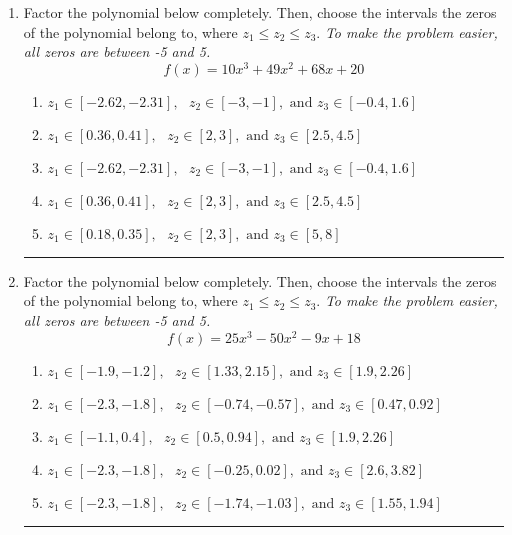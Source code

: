 \documentclass[14pt]{extbook}
\newcommand{\litem}[1]{\item#1\hspace*{-1cm}\rule{\textwidth}{0.4pt}}
\begin{document}
\begin{enumerate}
{\begin{enumerate}[label=\Alph*.]
\end{enumerate} }
\litem{
Factor the polynomial below completely. Then, choose the intervals the zeros of the polynomial belong to, where $z_1 \leq z_2 \leq z_3$. \textit{To make the problem easier, all zeros are between -5 and 5.}\[ f(x) = 10x^{3} +49 x^{2} +68 x + 20 \]\begin{enumerate}[label=\Alph*.]
\item \( z_1 \in [-2.62, -2.31], \text{   }  z_2 \in [-3, -1], \text{   and   } z_3 \in [-0.4, 1.6] \)
\item \( z_1 \in [0.36, 0.41], \text{   }  z_2 \in [2, 3], \text{   and   } z_3 \in [2.5, 4.5] \)
\item \( z_1 \in [-2.62, -2.31], \text{   }  z_2 \in [-3, -1], \text{   and   } z_3 \in [-0.4, 1.6] \)
\item \( z_1 \in [0.36, 0.41], \text{   }  z_2 \in [2, 3], \text{   and   } z_3 \in [2.5, 4.5] \)
\item \( z_1 \in [0.18, 0.35], \text{   }  z_2 \in [2, 3], \text{   and   } z_3 \in [5, 8] \)

\end{enumerate} }
\litem{
Factor the polynomial below completely. Then, choose the intervals the zeros of the polynomial belong to, where $z_1 \leq z_2 \leq z_3$. \textit{To make the problem easier, all zeros are between -5 and 5.}\[ f(x) = 25x^{3} -50 x^{2} -9 x + 18 \]\begin{enumerate}[label=\Alph*.]
\item \( z_1 \in [-1.9, -1.2], \text{   }  z_2 \in [1.33, 2.15], \text{   and   } z_3 \in [1.9, 2.26] \)
\item \( z_1 \in [-2.3, -1.8], \text{   }  z_2 \in [-0.74, -0.57], \text{   and   } z_3 \in [0.47, 0.92] \)
\item \( z_1 \in [-1.1, 0.4], \text{   }  z_2 \in [0.5, 0.94], \text{   and   } z_3 \in [1.9, 2.26] \)
\item \( z_1 \in [-2.3, -1.8], \text{   }  z_2 \in [-0.25, 0.02], \text{   and   } z_3 \in [2.6, 3.82] \)
\item \( z_1 \in [-2.3, -1.8], \text{   }  z_2 \in [-1.74, -1.03], \text{   and   } z_3 \in [1.55, 1.94] \)


\end{enumerate}}
\end{enumerate}
\end{document}
